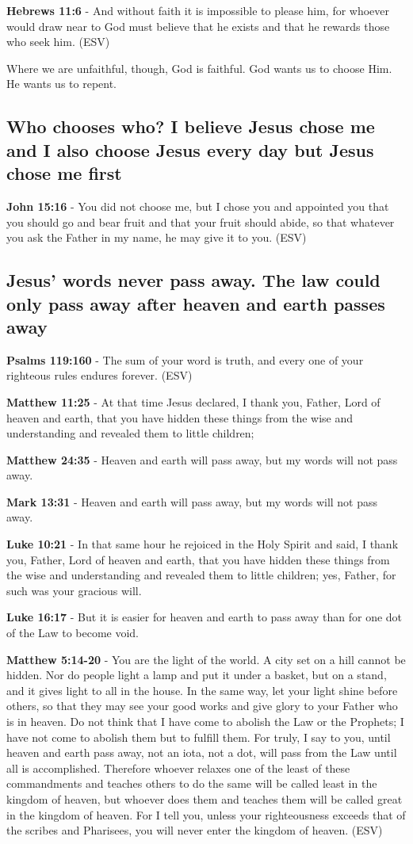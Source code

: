\documentclass[11pt]{article}
\begin{document}
\textbf{Hebrews 11:6} - And without faith it is impossible to please him, for whoever would draw near to God must believe that he exists and that he rewards those who seek him. (ESV)

Where we are unfaithful, though, God is faithful. God wants us to choose Him. He wants us to repent.

\subsection{Who chooses who? I believe Jesus chose me and I also choose Jesus every day but Jesus chose me first}
\label{sec:orgc1c6532}
\textbf{John 15:16} - You did not choose me, but I chose you and appointed you that you should go and bear fruit and that your fruit should abide, so that whatever you ask the Father in my name, he may give it to you. (ESV)

\subsection{Jesus' words never pass away. The law could only pass away after heaven and earth passes away}
\label{sec:orgafda797}
\textbf{Psalms 119:160} - The sum of your word is truth, and every one of your righteous rules endures forever. (ESV)

\textbf{Matthew 11:25} - At that time Jesus declared, I thank you, Father, Lord of heaven and earth, that you have hidden these things from the wise and understanding and revealed them to little children;

\textbf{Matthew 24:35} - Heaven and earth will pass away, but my words will not pass away.

\textbf{Mark 13:31} - Heaven and earth will pass away, but my words will not pass away.

\textbf{Luke 10:21} - In that same hour he rejoiced in the Holy Spirit and said, I thank you, Father, Lord of heaven and earth, that you have hidden these things from the wise and understanding and revealed them to little children; yes, Father, for such was your gracious will.

\textbf{Luke 16:17} - But it is easier for heaven and earth to pass away than for one dot of the Law to become void.

\textbf{Matthew 5:14-20} - You are the light of the world. A city set on a hill cannot be hidden. Nor do people light a lamp and put it under a basket, but on a stand, and it gives light to all in the house. In the same way, let your light shine before others, so that they may see your good works and give glory to your Father who is in heaven. Do not think that I have come to abolish the Law or the Prophets; I have not come to abolish them but to fulfill them. For truly, I say to you, until heaven and earth pass away, not an iota, not a dot, will pass from the Law until all is accomplished. Therefore whoever relaxes one of the least of these commandments and teaches others to do the same will be called least in the kingdom of heaven, but whoever does them and teaches them will be called great in the kingdom of heaven. For I tell you, unless your righteousness exceeds that of the scribes and Pharisees, you will never enter the kingdom of heaven. (ESV)
\end{document}
